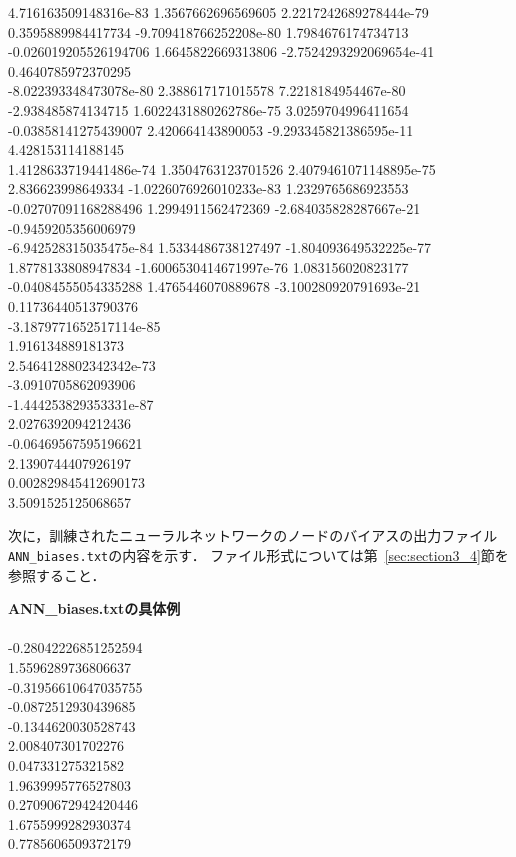 \documentclass[11pt,titlepage,dvipdfmx,twoside]{jarticle}
\begin{document}
\begin{oframed}
4.716163509148316e-83 1.3567662696569605 2.2217242689278444e-79 0.3595889984417734 -9.709418766252208e-80 1.7984676174734713 -0.026019205526194706 1.6645822669313806 -2.7524293292069654e-41 0.4640785972370295   \\
-8.022393348473078e-80 2.388617171015578 7.2218184954467e-80 -2.938485874134715 1.6022431880262786e-75 3.0259704996411654 -0.03858141275439007 2.420664143890053 -9.293345821386595e-11 4.428153114188145   \\
1.4128633719441486e-74 1.3504763123701526 2.4079461071148895e-75 2.836623998649334 -1.0226076926010233e-83 1.2329765686923553 -0.02707091168288496 1.2994911562472369 -2.684035828287667e-21 -0.9459205356006979   \\
-6.942528315035475e-84 1.5334486738127497 -1.804093649532225e-77 1.8778133808947834 -1.6006530414671997e-76 1.083156020823177 -0.04084555054335288 1.4765446070889678 -3.100280920791693e-21 0.11736440513790376   \\
-3.1879771652517114e-85   \\
1.916134889181373   \\
2.5464128802342342e-73   \\
-3.0910705862093906   \\
-1.444253829353331e-87   \\
2.0276392094212436   \\
-0.06469567595196621   \\
2.1390744407926197   \\
0.002829845412690173   \\
3.5091525125068657  \\
\end{oframed}

\bigskip

次に，訓練されたニューラルネットワークのノードのバイアスの出力ファイル\verb|ANN_biases.txt|の内容を示す．
ファイル形式については第~\ref{sec:section3_4}節を参照すること．

\bigskip

\begin{oframed}
{\bf ANN\_biases.txtの具体例}\\\\
-0.28042226851252594 \\
1.5596289736806637 \\
-0.31956610647035755 \\
-0.0872512930439685 \\
-0.1344620030528743 \\
2.008407301702276 \\
0.047331275321582 \\
1.9639995776527803 \\
0.27090672942420446 \\
1.6755999282930374 \\
0.7785606509372179
\end{oframed}
\end{document}
